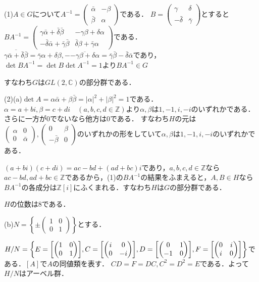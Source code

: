 \documentclass[
		book,
		head_space=20mm,
		foot_space=20mm,
		gutter=10mm,
		line_length=190mm
]{jlreq}
\begin{document}
(1)$A\in G$について$A^{-1}=\begin{pmatrix}
	\bar{\alpha} & -\beta \\
	\bar{\beta} & \alpha
\end{pmatrix}$である．
$B=\begin{pmatrix}
	\gamma & \delta \\
	-\bar{\delta} & \bar{\gamma}
	\end{pmatrix}$とすると$BA^{-1}=\begin{pmatrix}
	\gamma\bar{\alpha}+\bar{\delta}\bar{\beta} & -\gamma\beta+\delta\alpha \\
	-\bar{\delta}\bar{\alpha}+\bar{\gamma}\bar{\beta} & \bar{\delta}\beta+\bar{\gamma}\alpha
\end{pmatrix}$である．$\overline{\gamma\bar{\alpha}+\bar{\delta}\bar{\beta}}=\bar{\gamma}\alpha+\delta\beta,-\overline{-\gamma\beta+\delta\alpha}=\bar{\gamma}\bar{\beta}-\bar{\delta}\bar{\alpha}$であり，$\det BA^{-1}=\det B \det A^{-1}=1$より$BA^{-1}\in G$

すなわち$G$は$GL(2,\mathbb{C})$の部分群である．

(2)(a)$\det A = \alpha\bar{\alpha}+\beta\bar{\beta}=|\alpha|^2+|\beta|^2=1$である．$\alpha=a+bi,\beta=c+di\quad(a,b,c,d\in \mathbb{Z})$より$\alpha,\beta$は$1,-1,i,-i$のいずれかである．さらに一方が$0$でないなら他方は$0$である．
すなわち$H$の元は$\begin{pmatrix}
	\alpha & 0 \\
	0 & \bar{\alpha}
\end{pmatrix},\begin{pmatrix}
	0 & \beta \\
	-\bar{\beta} & 0
\end{pmatrix}$のいずれかの形をしていて$\alpha,\beta$は$1,-1,i,-i$のいずれかである．

$(a+bi)(c+di)=ac-bd+(ad+bc)i$であり，$a,b,c,d \in \mathbb{Z}$なら$ac-bd,ad+bc\in \mathbb{Z}$であるから，(1)の$BA^{-1}$の結果をふまえると，$A,B\in H$なら$BA^{-1}$の各成分は$\mathbb{Z}[i]$にふくまれる．すなわち$H$は$G$の部分群である．

$H$の位数は$8$である．

(b)$N=\left\{ \pm \begin{pmatrix}
	1 & 0 \\
	0 & 1
\end{pmatrix} \right\}$とする．

$H/N=\left\{ E=\qty[\begin{pmatrix}
	1 & 0 \\
	0 & 1
\end{pmatrix}], C=\qty[\begin{pmatrix}
	i & 0 \\
	0 & -i
	\end{pmatrix}], D=\qty[\begin{pmatrix}
		0 & 1 \\
		-1 & 0
	\end{pmatrix}], F=\qty[\begin{pmatrix}
		0 & i \\
		i & 0
	\end{pmatrix}]\right\}$である．$[A]$で$A$の同値類を表す．
$CD=F=DC,C^2=D^2=E$である．よって$H/N$はアーベル群．
\end{document}
